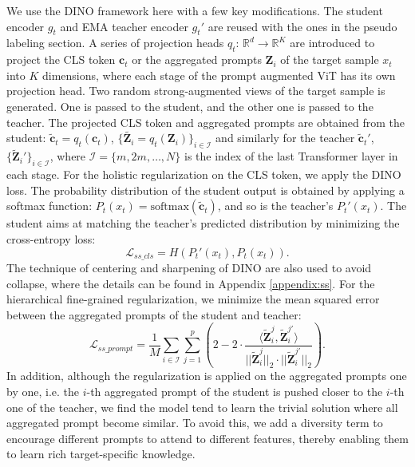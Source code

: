 \documentclass{article} \usepackage{iclr2023_conference,times}
\def\vc{{\bm{c}}}
\def\mZ{{\bm{Z}}}
\newcommand{\R}{\mathbb{R}}
\newcommand{\softmax}{\mathrm{softmax}}
\begin{document}
We use the DINO \citep{caron2021emerging} framework here with a few key modifications. The student encoder $g_t$ and EMA teacher encoder $g_t'$ are reused with the ones in the pseudo labeling section. A series of projection heads $q_t$: $\displaystyle \R^d \rightarrow \displaystyle \R^K$ are introduced to project the CLS token $\displaystyle \vc_t$ or the aggregated prompts $\displaystyle \mZ_i$ of the target sample $x_t$ into $K$ dimensions, where each stage of the prompt augmented ViT has its own projection head. Two random strong-augmented views of the target sample is generated. One is passed to the student, and the other one is passed to the teacher. The projected CLS token and aggregated prompts are obtained from the student: $\tilde{\displaystyle \vc}_t=q_t(\displaystyle \vc_t)$, $\{\tilde{\displaystyle \mZ_i}=q_t(\displaystyle \mZ_i)\}_{i\in \mathcal{I}}$ and similarly for the teacher $\tilde{\displaystyle \vc}_t'$, $\{\tilde{\displaystyle \mZ}_i'\}_{i\in \mathcal{I}}$, where $\mathcal{I}=\{m, 2m, \dots, N\}$ is the index of the last Transformer layer in each stage. For the holistic regularization on the CLS token, we apply the DINO loss. The probability distribution of the student output is obtained by applying a softmax function: $P_t(x_t)=\softmax(\tilde{\displaystyle \vc}_t)$, and so is the teacher's $P_t'(x_t)$.  The student aims at matching the teacher's predicted distribution by minimizing the cross-entropy loss:
\begin{equation}
    \mathcal{L}_{ss\_cls} = H(P_t'(x_t), P_t(x_t)).
\end{equation}
The technique of centering and sharpening of DINO are also used to avoid collapse, where the details can be found in Appendix \ref{appendix:ss}.
For the hierarchical fine-grained regularization, we minimize the mean squared error between the aggregated prompts of the student and teacher:
\begin{equation}
    \mathcal{L}_{ss\_prompt} = \frac{1}{M} \sum_{i\in \mathcal{I}} \sum_{j=1}^{p} \left(2-2 \cdot \frac{\langle \tilde{\displaystyle \mZ}_i^j, \tilde{\displaystyle \mZ}_i^{j\prime} \rangle }{||\tilde{\displaystyle \mZ}_i^j||_2 \cdot ||\tilde{\displaystyle \mZ}_i^{j'}||_2}\right).
\end{equation}
In addition, although the regularization is applied on the aggregated prompts one by one, i.e. the $i$-th aggregated prompt of the student is pushed closer to the $i$-th one of the teacher, we find the model tend to learn the trivial solution where all aggregated prompt become similar. To avoid this, we add a diversity term to encourage different prompts to attend to different features, thereby enabling them to learn rich target-specific knowledge. 
\end{document}
